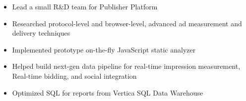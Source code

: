 \documentclass[10pt,a4paper,ragged2e,withhyper]{altacv}
\begin{document}
\begin{paracol}{2}
\divider

\begin{itemize}
  \item Lead a small R\&D team for Publisher Platform
  \item Researched protocol-level and browser-level, advanced ad measurement and delivery techniques
  \item Implemented prototype on-the-fly JavaScript static analyzer
  \item Helped build next-gen data pipeline for real-time impression measurement, Real-time bidding, and social integration
  \item Optimized SQL for reports from Vertica SQL Data Warehouse
\end{itemize}




%


\end{paracol}
\end{document}

